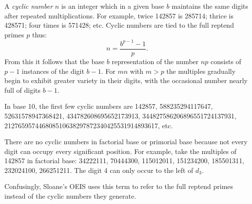 \documentclass[12pt]{article}
\begin{document}
A {\em cyclic number} $n$ is an integer which in a given base $b$ maintains the same digits after repeated multiplications. For example, twice 142857 is 285714; thrice is 428571; four times is 571428; etc. Cyclic numbers are tied to the full reptend primes $p$ thus: $$n = \frac{b^{p - 1} - 1}{p}.$$ From this it follows that the base $b$ representation of the number $np$ consists of $p - 1$ instances of the digit $b - 1$. For $mn$ with $m > p$ the multiples gradually begin to exhibit greater variety in their digits, with the occasional number nearly full of digits $b - 1$.

In base 10, the first few cyclic numbers are 142857, 588235294117647, 52631578947368421, 434782608695652173913, 344827586206896551724137931, 212765957446808510638297872340425531914893617, etc.

There are no cyclic numbers in factorial base or primorial base because not every digit can occupy every significant position. For example, take the multiples of 142857 in factorial base: 34222111, 70444300, 115012011, 151234200, 185501311, 232024100, 266251211. The digit 4 can only occur to the left of $d_3$.

Confusingly, Sloane's OEIS uses this term to refer to the full reptend primes instead of the cyclic numbers they generate.
\end{document}
